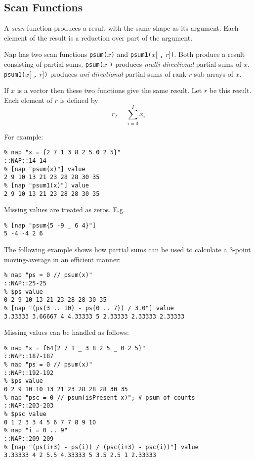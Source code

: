 \subsection{Scan Functions}
\label{function-Scan}

A \emph{scan} function produces a result with the same shape as its argument.
Each element of the result is a reduction over part of the argument.

Nap has two scan functions 
\texttt{psum(}$x$\texttt{)}
and
\texttt{psum1(}$x$[ \texttt{,} $r$]\texttt{)}.
Both produce a result consisting of partial-sums.
\texttt{psum(}$x$ \texttt{)} produces \emph{multi-directional}
partial-sums of $x$.
\texttt{psum1(}$x$[ \texttt{,} $r$]\texttt{)} produces
\emph{uni-directional} partial-sums of rank-$r$ sub-arrays of $x$.

If $x$ is a vector then these two functions give the same result.
Let $r$ be this result.
Each element of $r$ is defined by
\[r_I = \sum_{i=0}^I x_i\]

For example:
  \begin{verbatim}
% nap "x = {2 7 1 3 8 2 5 0 2 5}"
::NAP::14-14
% [nap "psum(x)"] value
2 9 10 13 21 23 28 28 30 35
% [nap "psum1(x)"] value
2 9 10 13 21 23 28 28 30 35
\end{verbatim}

  \par Missing values are treated as zeros. E.g.
  \begin{verbatim}
% [nap "psum{5 -9 _ 6 4}"]
5 -4 -4 2 6
\end{verbatim}

  \par The following example shows how partial sums can be used to
  calculate a 3-point moving-average in an efficient manner:
  \begin{verbatim}
% nap "ps = 0 // psum(x)"
::NAP::25-25
% $ps value
0 2 9 10 13 21 23 28 28 30 35
% [nap "(ps(3 .. 10) - ps(0 .. 7)) / 3.0"] value
3.33333 3.66667 4 4.33333 5 2.33333 2.33333 2.33333
\end{verbatim}

  \par Missing values can be handled as follows:
  \begin{verbatim}
% nap "x = f64{2 7 1 _ 3 8 2 5 _ 0 2 5}"
::NAP::187-187
% nap "ps = 0 // psum(x)"
::NAP::192-192
% $ps value
0 2 9 10 10 13 21 23 28 28 28 30 35
% nap "psc = 0 // psum(isPresent x)"; # psum of counts
::NAP::203-203
% $psc value
0 1 2 3 3 4 5 6 7 7 8 9 10
% nap "i = 0 .. 9"
::NAP::209-209
% [nap "(ps(i+3) - ps(i)) / (psc(i+3) - psc(i))"] value
3.33333 4 2 5.5 4.33333 5 3.5 2.5 1 2.33333
\end{verbatim}

